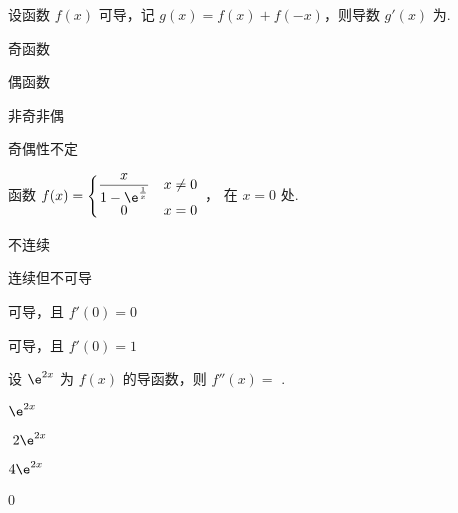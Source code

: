 \begin{problem}设函数 $f(x)$ 可导，记
$g\left( x \right) = f\left( x \right) + f( - x)$，则导数
$g'\left( x \right)$ 为.

\begin{abcd} 
\item 奇函数

\item 偶函数

\item 非奇非偶

\item 奇偶性不定

\end{abcd} 

\end{problem}           

\begin{problem}函数 $f(x) = \left\{ \begin{matrix}
\displaystyle \frac{x}{1 - \e^{\frac{1}{x}}} & x \neq 0 \\
0 & x = 0 \\
\end{matrix} \right.\ $， 在 $x = 0$ 处.

\begin{abcd} 
	
\item 不连续

\item 连续但不可导

\item 可导，且 $f'\left( 0 \right) = 0$

\item 可导，且 $f'\left( 0 \right) = 1$

\end{abcd}

\end{problem}           


\begin{problem}设 $\e^{2x}$ 为 $f(x)$ 的导函数，则 $f''\left( x \right) =$ .

\begin{abcd} 
	
\item $\e^{2x}$

\item $\ {2\e}^{2x}$

\item ${4\e}^{2x}$

\item 0

\end{abcd}

\end{problem}           


